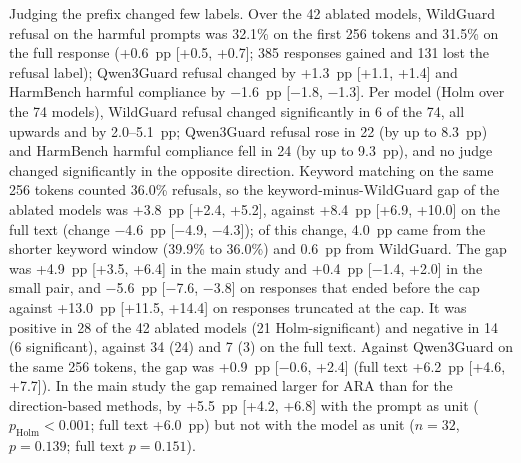 
Judging the prefix changed few labels. Over the 42 ablated models, WildGuard
refusal on the harmful prompts was 32.1\% on the first 256 tokens and 31.5\%
on the full response (+0.6~pp [+0.5, +0.7]; 385 responses gained and 131 lost
the refusal label); Qwen3Guard refusal changed by +1.3~pp [+1.1, +1.4] and
HarmBench harmful compliance by $-$1.6~pp [$-$1.8, $-$1.3]. Per model (Holm
over the 74 models), WildGuard refusal changed significantly in 6 of the 74, all
upwards and by 2.0--5.1~pp; Qwen3Guard refusal rose in 22 (by up to 8.3~pp)
and HarmBench harmful compliance fell in 24 (by up to 9.3~pp), and no judge
changed significantly in the opposite direction.
Keyword matching on the same 256 tokens counted 36.0\% refusals, so the
keyword-minus-WildGuard gap of the ablated models was +3.8~pp [+2.4, +5.2],
against +8.4~pp [+6.9, +10.0] on the full text (change $-$4.6~pp [$-$4.9,
$-$4.3]); of this change, 4.0~pp came from the shorter keyword window (39.9\%
to 36.0\%) and 0.6~pp from WildGuard. The gap was +4.9~pp [+3.5, +6.4] in the
main study and +0.4~pp [$-$1.4, +2.0] in the small pair, and $-$5.6~pp
[$-$7.6, $-$3.8] on responses that ended before the cap against +13.0~pp
[+11.5, +14.4] on responses truncated at the cap. It was positive in 28 of the 42 ablated
models (21 Holm-significant) and negative in 14 (6 significant), against 34
(24) and 7 (3) on the full text. Against Qwen3Guard on the same 256 tokens,
the gap was +0.9~pp [$-$0.6, +2.4] (full text +6.2~pp [+4.6, +7.7]). In the
main study the gap remained larger for ARA than for the direction-based
methods, by +5.5~pp [+4.2, +6.8] with the prompt as unit
($p_\mathrm{Holm}<0.001$; full text +6.0~pp) but not with the model as unit
($n=32$, $p=0.139$; full text $p=0.151$).
